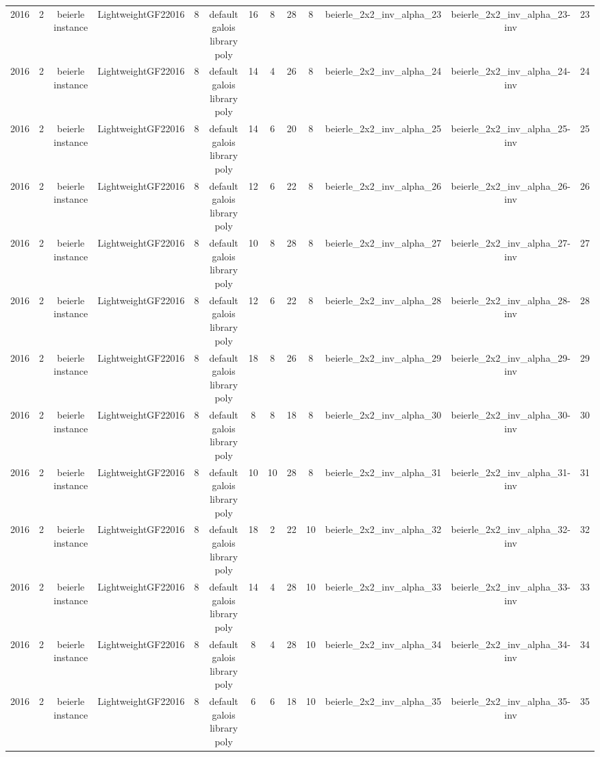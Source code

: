 \begin{tabular}{c c c c c c c c c c c c c}
2016 & 2 & beierle instance & LightweightGF22016 & 8 & default galois library poly & 16 & 8 & 28 & 8 & beierle_2x2_inv_alpha_23 & beierle_2x2_inv_alpha_23-inv & 23 \\
2016 & 2 & beierle instance & LightweightGF22016 & 8 & default galois library poly & 14 & 4 & 26 & 8 & beierle_2x2_inv_alpha_24 & beierle_2x2_inv_alpha_24-inv & 24 \\
2016 & 2 & beierle instance & LightweightGF22016 & 8 & default galois library poly & 14 & 6 & 20 & 8 & beierle_2x2_inv_alpha_25 & beierle_2x2_inv_alpha_25-inv & 25 \\
2016 & 2 & beierle instance & LightweightGF22016 & 8 & default galois library poly & 12 & 6 & 22 & 8 & beierle_2x2_inv_alpha_26 & beierle_2x2_inv_alpha_26-inv & 26 \\
2016 & 2 & beierle instance & LightweightGF22016 & 8 & default galois library poly & 10 & 8 & 28 & 8 & beierle_2x2_inv_alpha_27 & beierle_2x2_inv_alpha_27-inv & 27 \\
2016 & 2 & beierle instance & LightweightGF22016 & 8 & default galois library poly & 12 & 6 & 22 & 8 & beierle_2x2_inv_alpha_28 & beierle_2x2_inv_alpha_28-inv & 28 \\
2016 & 2 & beierle instance & LightweightGF22016 & 8 & default galois library poly & 18 & 8 & 26 & 8 & beierle_2x2_inv_alpha_29 & beierle_2x2_inv_alpha_29-inv & 29 \\
2016 & 2 & beierle instance & LightweightGF22016 & 8 & default galois library poly & 8 & 8 & 18 & 8 & beierle_2x2_inv_alpha_30 & beierle_2x2_inv_alpha_30-inv & 30 \\
2016 & 2 & beierle instance & LightweightGF22016 & 8 & default galois library poly & 10 & 10 & 28 & 8 & beierle_2x2_inv_alpha_31 & beierle_2x2_inv_alpha_31-inv & 31 \\
2016 & 2 & beierle instance & LightweightGF22016 & 8 & default galois library poly & 18 & 2 & 22 & 10 & beierle_2x2_inv_alpha_32 & beierle_2x2_inv_alpha_32-inv & 32 \\
2016 & 2 & beierle instance & LightweightGF22016 & 8 & default galois library poly & 14 & 4 & 28 & 10 & beierle_2x2_inv_alpha_33 & beierle_2x2_inv_alpha_33-inv & 33 \\
2016 & 2 & beierle instance & LightweightGF22016 & 8 & default galois library poly & 8 & 4 & 28 & 10 & beierle_2x2_inv_alpha_34 & beierle_2x2_inv_alpha_34-inv & 34 \\
2016 & 2 & beierle instance & LightweightGF22016 & 8 & default galois library poly & 6 & 6 & 18 & 10 & beierle_2x2_inv_alpha_35 & beierle_2x2_inv_alpha_35-inv & 35 \\

\end{tabular}
